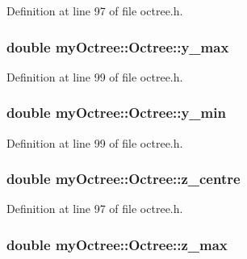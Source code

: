 Definition at line 97 of file octree.\+h.

\hypertarget{classmy_octree_1_1_octree_adc54149b3555e1ed3d9a94e14cfbfd4f}{}
\subsubsection[{y\+\_\+max}]{\setlength{\rightskip}{0pt plus 5cm}double my\+Octree\+::\+Octree\+::y\+\_\+max}\label{classmy_octree_1_1_octree_adc54149b3555e1ed3d9a94e14cfbfd4f}


Definition at line 99 of file octree.\+h.

\hypertarget{classmy_octree_1_1_octree_a3a634a2744d467d6cc6393c35c34edd4}{}
\subsubsection[{y\+\_\+min}]{\setlength{\rightskip}{0pt plus 5cm}double my\+Octree\+::\+Octree\+::y\+\_\+min}\label{classmy_octree_1_1_octree_a3a634a2744d467d6cc6393c35c34edd4}


Definition at line 99 of file octree.\+h.

\hypertarget{classmy_octree_1_1_octree_a77e1cbfe3f0c11f2dd7bb682a1f2bc1e}{}
\subsubsection[{z\+\_\+centre}]{\setlength{\rightskip}{0pt plus 5cm}double my\+Octree\+::\+Octree\+::z\+\_\+centre}\label{classmy_octree_1_1_octree_a77e1cbfe3f0c11f2dd7bb682a1f2bc1e}


Definition at line 97 of file octree.\+h.

\hypertarget{classmy_octree_1_1_octree_a1ec71e5c3e48edf04aa20639dd055e79}{}
\subsubsection[{z\+\_\+max}]{\setlength{\rightskip}{0pt plus 5cm}double my\+Octree\+::\+Octree\+::z\+\_\+max}\label{classmy_octree_1_1_octree_a1ec71e5c3e48edf04aa20639dd055e79}


